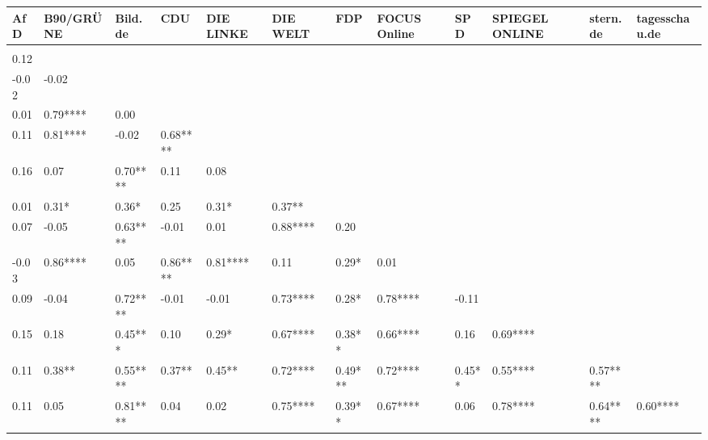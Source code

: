 \begin{table}[ht]
\centering
\begin{tabular}{llllllllllll}
  \hline
AfD & B90/GRÜNE & Bild.de & CDU & DIE LINKE & DIE WELT & FDP & FOCUS Online & SPD & SPIEGEL ONLINE & stern.de & tagesschau.de \\ 
  \hline
 &  &  &  &  &  &  &  &  &  &  &  \\ 
   0.12     &  &  &  &  &  &  &  &  &  &  &  \\ 
  -0.02     & -0.02     &  &  &  &  &  &  &  &  &  &  \\ 
   0.01     &  0.79**** &  0.00     &  &  &  &  &  &  &  &  &  \\ 
   0.11     &  0.81**** & -0.02     &  0.68**** &  &  &  &  &  &  &  &  \\ 
   0.16     &  0.07     &  0.70**** &  0.11     &  0.08     &  &  &  &  &  &  &  \\ 
   0.01     &  0.31*    &  0.36*    &  0.25     &  0.31*    &  0.37**   &  &  &  &  &  &  \\ 
   0.07     & -0.05     &  0.63**** & -0.01     &  0.01     &  0.88**** &  0.20     &  &  &  &  &  \\ 
  -0.03     &  0.86**** &  0.05     &  0.86**** &  0.81**** &  0.11     &  0.29*    &  0.01     &  &  &  &  \\ 
   0.09     & -0.04     &  0.72**** & -0.01     & -0.01     &  0.73**** &  0.28*    &  0.78**** & -0.11     &  &  &  \\ 
   0.15     &  0.18     &  0.45***  &  0.10     &  0.29*    &  0.67**** &  0.38**   &  0.66**** &  0.16     &  0.69**** &  &  \\ 
   0.11     &  0.38**   &  0.55**** &  0.37**   &  0.45**   &  0.72**** &  0.49***  &  0.72**** &  0.45**   &  0.55**** &  0.57**** &  \\ 
   0.11     &  0.05     &  0.81**** &  0.04     &  0.02     &  0.75**** &  0.39**   &  0.67**** &  0.06     &  0.78**** &  0.64**** &  0.60**** \\ 
   \hline
\end{tabular}
\end{table}
